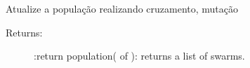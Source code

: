 \documentclass[letterpaper,10pt,english]{sphinxmanual}
\begin{document}
\begin{fulllineitems}
\begin{fulllineitems}
\end{fulllineitems}


\begin{fulllineitems}
\label{\detokenize{index:ga.Genetic.update_swarm}}
Atualize a população realizando cruzamento, mutação
\begin{description}
\item[{Returns:}] \leavevmode
:return population( of ): returns a list of
swarms.

\end{description}

\end{fulllineitems}


\end{fulllineitems}

\end{document}

